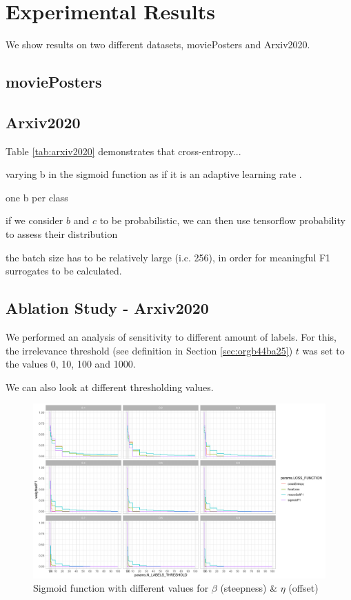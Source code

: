 
\section{Experimental Results}
\label{sec:orgc23a664}

We show results on two different datasets, moviePosters and Arxiv2020.

\subsection{moviePosters}


\subsection{Arxiv2020}

Table \ref{tab:arxiv2020} demonstrates that cross-entropy...

varying b in the sigmoid function as if it is an adaptive learning rate .

one b per class

if we consider \(b\) and \(c\) to be probabilistic, we can then use tensorflow probability to assess their distribution

the batch size has to be relatively large (i.c. 256), in order for meaningful F1 surrogates to be calculated.

\subsection{Ablation Study - Arxiv2020}

We performed an analysis of sensitivity to different amount of labels. For this, the irrelevance threshold (see definition in Section \ref{sec:orgb44ba25}) $t$ was set to the values 0, 10, 100 and 1000.

We can also look at different thresholding values.

\begin{figure}[htbp]
\centering
\includegraphics[width=.9\linewidth]{./images/ablation.pdf}
\caption{\label{fig:sigmoid}
Sigmoid function with different values for $\beta$ (steepness) \& $\eta$ (offset)}
\end{figure}




